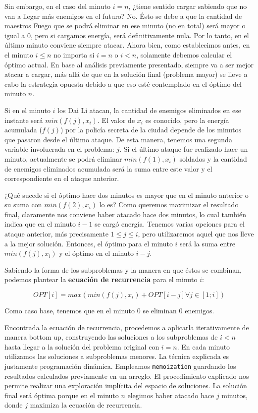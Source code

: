 \documentclass{article}
\begin{document}
Sin embargo, en el caso del minuto $i = n$, ¿tiene sentido cargar sabiendo que no van a llegar más enemigos en el futuro? No. Ésto se debe a que la cantidad de maestros Fuego que se podrá eliminar en ese minuto (no en total) será mayor o igual a 0, pero si cargamos energía, será definitivamente nula. Por lo tanto, en el último minuto conviene siempre atacar. Ahora bien, como establecimos antes, en el minuto $i \leq n$ no importa si $i = n$ o $i < n$, solamente debemos calcular el óptimo actual. En base al análisis previamente presentado, siempre va a ser mejor atacar a cargar, más allá de que en la solución final (problema mayor) se lleve a cabo la estrategia opuesta debido a que eso esté contemplado en el óptimo del minuto $n$. 

Si en el minuto $i$ los Dai Li atacan, la cantidad de enemigos eliminados en ese instante será $min(f(j), x_i)$. El valor de $x_i$ es conocido, pero la energía acumulada ($f(j)$) por la policía secreta de la ciudad depende de los minutos que pasaron desde el último ataque. De esta manera, tenemos una segunda variable involucrada en el problema: $j$. Si el último ataque fue realizado hace un minuto, actualmente se podrá eliminar $min(f(1), x_i)$ soldados y la cantidad de enemigos eliminados acumulada será la suma entre este valor y el correspondiente en el ataque anterior. 

¿Qué sucede si el óptimo hace dos minutos es mayor que en el minuto anterior o su suma con $min(f(2), x_i)$ lo es? Como queremos maximizar el resultado final, claramente nos conviene haber atacado hace dos minutos, lo cual también indica que en el minuto $i - 1$ se cargó energía. Tenemos varias opciones para el ataque anterior, más precisamente $1 \leq j \leq i$, pero utilizaremos aquel que nos lleve a la mejor solución. Entonces, el óptimo para el minuto $i$ será la suma entre $min(f(j), x_i)$ y el óptimo en el minuto $i - j$.

Sabiendo la forma de los subproblemas y la manera en que éstos se combinan, podemos plantear la \textbf{ecuación de recurrencia} para el minuto $i$:

$$OPT[i] = max(min(f(j), x_i) + OPT[i - j] \forall j \in [1; i])$$

Como caso base, tenemos que en el minuto 0 se eliminan 0 enemigos.

Encontrada la ecuación de recurrencia, procedemos a aplicarla iterativamente de manera bottom up, construyendo las soluciones a los subproblemas de $i < n$ hasta llegar a la solución del problema original con $i = n$. En cada minuto utilizamos las soluciones a subproblemas menores. La técnica explicada es justamente programación dinámica. Empleamos \texttt{memoization} guardando los resultados calculados previamente en un arreglo. El procedimiento explicado nos permite realizar una exploración implícita del espacio de soluciones. La solución final será óptima porque en el minuto $n$ elegimos haber atacado hace $j$ minutos, donde $j$ maximiza la ecuación de recurrencia.
\end{document}
